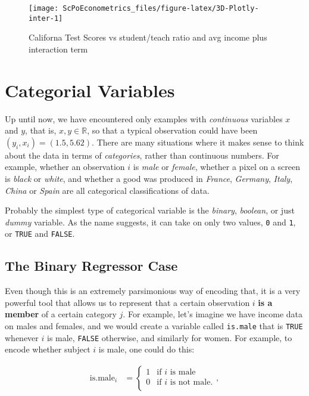 \documentclass[]{book}
\begin{document}
\begin{figure}

{\centering \texttt{[image: ScPoEconometrics\_files/figure-latex/3D-Plotly-inter-1]} 

}

\caption{Californa Test Scores vs student/teach ratio and avg income plus interaction term}\label{fig:3D-Plotly-inter}
\end{figure}

\chapter{Categorial Variables}\label{categorical-vars}

Up until now, we have encountered only examples with \emph{continuous}
variables \(x\) and \(y\), that is, \(x,y \in \mathbb{R}\), so that a
typical observation could have been \((y_i,x_i) = (1.5,5.62)\). There
are many situations where it makes sense to think about the data in
terms of \emph{categories}, rather than continuous numbers. For example,
whether an observation \(i\) is \emph{male} or \emph{female}, whether a
pixel on a screen is \emph{black} or \emph{white}, and whether a good
was produced in \emph{France}, \emph{Germany}, \emph{Italy},
\emph{China} or \emph{Spain} are all categorical classifications of
data.

Probably the simplest type of categorical variable is the \emph{binary},
\emph{boolean}, or just \emph{dummy} variable. As the name suggests, it
can take on only two values, \texttt{0} and \texttt{1}, or \texttt{TRUE}
and \texttt{FALSE}.

\section{The Binary Regressor Case}\label{the-binary-regressor-case}

Even though this is an extremely parsimonious way of encoding that, it
is a very powerful tool that allows us to represent that a certain
observation \(i\) \textbf{is a member} of a certain category \(j\). For
example, let's imagine we have income data on males and females, and we
would create a variable called \texttt{is.male} that is \texttt{TRUE}
whenever \(i\) is male, \texttt{FALSE} otherwise, and similarly for
women. For example, to encode whether subject \(i\) is male, one could
do this:

\begin{align*}
\text{is.male}_i &=  \begin{cases}
                    1 & \text{if }i\text{ is male} \\
                    0 & \text{if }i\text{ is not male}. \\
                 \end{cases}, \\
\end{align*}
\end{document}
